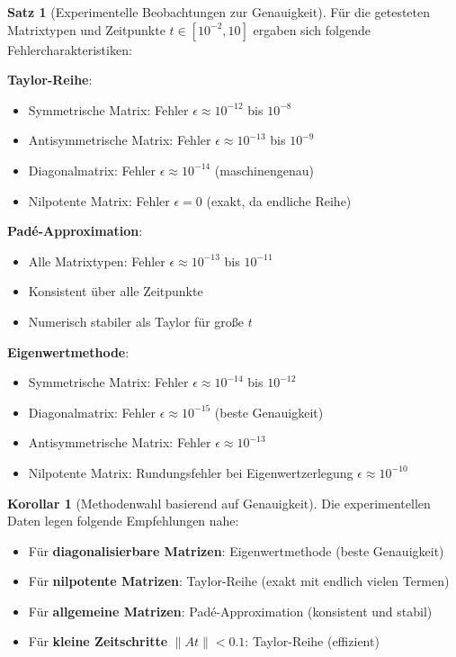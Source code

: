 ﻿\documentclass[a4paper,12pt]{report}
\theoremstyle{definition}
\newtheorem{satz}{Satz}
\newtheorem{korollar}{Korollar}
\begin{document}
	\begin{satz}[Experimentelle Beobachtungen zur Genauigkeit]
		Für die getesteten Matrixtypen und Zeitpunkte $t \in [10^{-2}, 10]$ ergaben sich folgende Fehlercharakteristiken:
		
		\textbf{Taylor-Reihe}:
		\begin{itemize}
			\item Symmetrische Matrix: Fehler $\epsilon \approx 10^{-12}$ bis $10^{-8}$
			\item Antisymmetrische Matrix: Fehler $\epsilon \approx 10^{-13}$ bis $10^{-9}$
			\item Diagonalmatrix: Fehler $\epsilon \approx 10^{-14}$ (maschinengenau)
			\item Nilpotente Matrix: Fehler $\epsilon = 0$ (exakt, da endliche Reihe)
		\end{itemize}
		
		\textbf{Padé-Approximation}:
		\begin{itemize}
			\item Alle Matrixtypen: Fehler $\epsilon \approx 10^{-13}$ bis $10^{-11}$
			\item Konsistent über alle Zeitpunkte
			\item Numerisch stabiler als Taylor für große $t$
		\end{itemize}
		
		\textbf{Eigenwertmethode}:
		\begin{itemize}
			\item Symmetrische Matrix: Fehler $\epsilon \approx 10^{-14}$ bis $10^{-12}$
			\item Diagonalmatrix: Fehler $\epsilon \approx 10^{-15}$ (beste Genauigkeit)
			\item Antisymmetrische Matrix: Fehler $\epsilon \approx 10^{-13}$
			\item Nilpotente Matrix: Rundungsfehler bei Eigenwertzerlegung $\epsilon \approx 10^{-10}$
		\end{itemize}
	\end{satz}
	
	\begin{korollar}[Methodenwahl basierend auf Genauigkeit]
		Die experimentellen Daten legen folgende Empfehlungen nahe:
		\begin{itemize}
			\item Für \textbf{diagonalisierbare Matrizen}: Eigenwertmethode (beste Genauigkeit)
			\item Für \textbf{nilpotente Matrizen}: Taylor-Reihe (exakt mit endlich vielen Termen)
			\item Für \textbf{allgemeine Matrizen}: Padé-Approximation (konsistent und stabil)
			\item Für \textbf{kleine Zeitschritte} $\|At\| < 0.1$: Taylor-Reihe (effizient)
		\end{itemize}
	\end{korollar}
	
\end{document}
